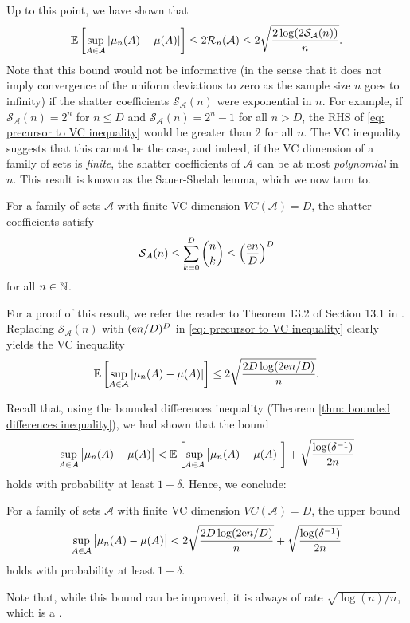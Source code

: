 Up to this point, we have shown that
\begin{equation}
\label{eq: precursor to VC inequality}
    \mathbb{E}\left[ \sup_{A \in \mathcal{A}} \abs{\mu_n(A) - \mu(A)} \right] \leq 2 \mathcal{R}_n(\mathcal{A}) \leq 2 \sqrt{ \frac{2 \log(2 \mathcal{S}_{\mathcal{A}}(n)) }{n} }.
\end{equation}
Note that this bound would not be informative (in the sense that it does not imply convergence of the uniform deviations to zero as the sample size $n$ goes to infinity) if the shatter coefficients $\mathcal{S}_{\mathcal{A}}(n)$ were exponential in $n$. For example, if $\mathcal{S}_{\mathcal{A}}(n) = 2^n$ for $n \leq D$ and $\mathcal{S}_{\mathcal{A}}(n) = 2^n - 1$ for all $n > D$, the RHS of \eqref{eq: precursor to VC inequality} would be greater than $2$ for all $n$. The VC inequality suggests that this cannot be the case, and indeed, if the VC dimension of a family of sets is \emph{finite}, the shatter coefficients of $\mathcal{A}$ can be at most \emph{polynomial} in $n$. This result is known as the Sauer-Shelah lemma, which we now turn to.

\begin{lemma}
For a family of sets $\mathcal{A}$ with finite VC dimension $VC(\mathcal{A}) = D$, the shatter coefficients satisfy
\[
    \mathcal{S}_{\mathcal{A}}(n) \leq \sum_{k=0}^D \binom{n}{k} \leq \left( \frac{\mathrm{e} n}{D} \right)^D
\]
for all $n \in \mathbb{N}$.
\end{lemma}

For a proof of this result, we refer the reader to Theorem 13.2 of Section 13.1 in \cite[p.~216]{devroye1996probabilistic}. Replacing $\mathcal{S}_{\mathcal{A}}(n)$ with $(\mathrm{e} n/D)^D$ in \eqref{eq: precursor to VC inequality} clearly yields the VC inequality
\[
    \mathbb{E}\left[ \sup_{A \in \mathcal{A}} \abs{\mu_n(A) - \mu(A)} \right] \leq 2 \sqrt{\frac{2D \log(2 \mathrm{e} n / D)}{n}}.
\]

Recall that, using the bounded differences inequality (Theorem \ref{thm: bounded differences inequality}), we had shown that the bound
\[
    \sup_{A \in \mathcal{A}} \big\lvert \mu_n(A) - \mu(A) \big\rvert < \mathbb{E}\left[\sup_{A \in \mathcal{A}} \big\lvert \mu_n(A) - \mu(A) \big\rvert\right] + \sqrt{\frac{\log(\delta^{-1})}{2n}}
\]
holds with probability at least $1 - \delta$. Hence, we conclude:

\begin{corollary}[VC Inequality]
For a family of sets $\mathcal{A}$ with finite VC dimension $VC(\mathcal{A}) = D$, the upper bound
\[
    \sup_{A \in \mathcal{A}} \big\lvert \mu_n(A) - \mu(A) \big\rvert < 2 \sqrt{\frac{2D \log(2 \mathrm{e} n / D)}{n}} + \sqrt{\frac{\log(\delta^{-1})}{2n}}
\]
holds with probability at least $1 - \delta$.
\end{corollary}

Note that, while this bound can be improved, it is always of rate $\sqrt{\log(n) / n}$, which is a .
